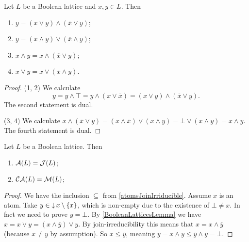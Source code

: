 \begin{lemma} \label{BooleanLatticesLemma}
Let $L$ be a Boolean lattice and $x,y\in L$. Then
\begin{enumerate}
\item $y = (x\vee y) \wedge (\overline{x}\vee y)$;
\item $y = (x\wedge y) \vee (\overline{x}\wedge y)$;
\item $x \wedge y = x\wedge (\overline{x}\vee y)$;
\item $x \vee y = x\vee (\overline{x}\wedge y)$.
\end{enumerate}
\end{lemma}
\begin{proof}
(1, 2) We calculate
\[ y = y \wedge \top = y \wedge (x\vee \overline{x}) = (x\vee y) \wedge (\overline{x}\vee y). \]
The second statement is dual.

(3, 4) We calculate $x\wedge (\overline{x}\vee y) = (x\wedge \overline{x})\vee (x\wedge y) = \bot \vee (x\wedge y) = x\wedge y$. The fourth statement is dual.
\end{proof}

\begin{lemma} \label{atomsJoinIrriducibleBoolean}
Let $L$ be a Boolean lattice. Then
\begin{enumerate}
\item $\operatorname{\mathcal{A}}(L) = \operatorname{\mathcal{J}}(L)$;
\item $\operatorname{\mathcal{CA}}(L) = \operatorname{\mathcal{M}}(L)$;
\end{enumerate}
\end{lemma}
\begin{proof}
We have the inclusion $\subseteq$ from \ref{atomsJoinIrriducible}. Assume $x$ is an atom. Take $y\in \operatorname{\downarrow} x\setminus\{x\}$, which is non-empty due to the existence of $\bot \neq x$. In fact we need to prove $y = \bot$. By \ref{BooleanLatticesLemma} we have $x = x\vee y = (x\wedge \overline{y})\vee y$. By join-irreducibility this means that $x = x\wedge \overline{y}$ (because $x\neq y$ by assumption). So $x\leq \overline{y}$, meaning $y = x\wedge y \leq \overline{y}\wedge y = \bot$.
\end{proof}


